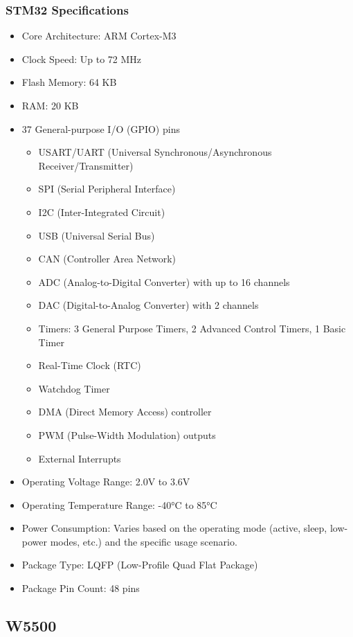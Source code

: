 \documentclass[
12pt,
oneside, 
onehalfspacing, 
nolistspacing, 
parskip, 
chapterinoneline, 
]{AASTCOMPUTER}
\begin{document}
\subsubsection{STM32 Specifications}
\begin{itemize}
    \item Core Architecture: ARM Cortex-M3
    \item Clock Speed: Up to 72 MHz
    \item Flash Memory: 64 KB
    \item RAM: 20 KB
    \item 37 General-purpose I/O (GPIO) pins
    \begin{itemize}
        \item USART/UART (Universal Synchronous/Asynchronous Receiver/Transmitter)
        \item SPI (Serial Peripheral Interface)
        \item I2C (Inter-Integrated Circuit)
        \item USB (Universal Serial Bus)
        \item CAN (Controller Area Network)
        \item ADC (Analog-to-Digital Converter) with up to 16 channels
        \item DAC (Digital-to-Analog Converter) with 2 channels
        \item Timers: 3 General Purpose Timers, 2 Advanced Control Timers, 1 Basic Timer
        \item Real-Time Clock (RTC)
        \item Watchdog Timer
        \item DMA (Direct Memory Access) controller
        \item PWM (Pulse-Width Modulation) outputs
        \item External Interrupts
    \end{itemize}
    \item Operating Voltage Range: 2.0V to 3.6V
    \item Operating Temperature Range: -40°C to 85°C
    \item Power Consumption: Varies based on the operating mode (active, sleep, low-power modes, etc.) and the specific usage scenario.
    \item Package Type: LQFP (Low-Profile Quad Flat Package)
    \item Package Pin Count: 48 pins
\end{itemize}

\subsection{W5500}
\end{document}
